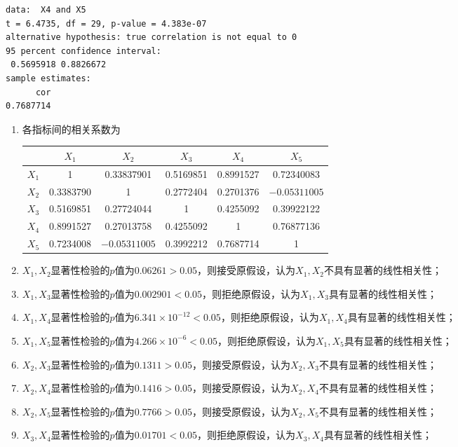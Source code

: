 \begin{enumerate}
\begin{lstlisting}
data:  X4 and X5
t = 6.4735, df = 29, p-value = 4.383e-07
alternative hypothesis: true correlation is not equal to 0
95 percent confidence interval:
 0.5695918 0.8826672
sample estimates:
      cor 
0.7687714 
\end{lstlisting}
    \summary
    \begin{enumerate}[label=(\arabic*)]
        \item 各指标间的相关系数为
        \begin{table}[H]
            \centering
            \begin{tabular}{|c|c|c|c|c|c|}
                \hline
                & $X_1$ & $X_2$ & $X_3$ & $X_4$ & $X_5$ \\ \hline
                $X_1$ & 1 & 0.33837901 & 0.5169851 & 0.8991527 & 0.72340083 \\ \hline
                $X_2$ & 0.3383790 & 1 & 0.2772404 & 0.2701376 & $-0.05311005$ \\ \hline
                $X_3$ & 0.5169851 & 0.27724044 & 1 & 0.4255092 & 0.39922122 \\ \hline
                $X_4$ & 0.8991527 & 0.27013758 & 0.4255092 & 1 & 0.76877136 \\ \hline
                $X_5$ & 0.7234008 & $-0.05311005$ & 0.3992212 & 0.7687714 & 1 \\ \hline
            \end{tabular}
        \end{table}
        \item $X_1,X_2$显著性检验的$p$值为$0.06261 > 0.05$，则接受原假设，认为$X_1,X_2$不具有显著的线性相关性；
        \item $X_1,X_3$显著性检验的$p$值为$0.002901 < 0.05$，则拒绝原假设，认为$X_1,X_3$具有显著的线性相关性；
        \item $X_1,X_4$显著性检验的$p$值为$6.341\times 10^{-12} < 0.05$，则拒绝原假设，认为$X_1,X_4$具有显著的线性相关性；
        \item $X_1,X_5$显著性检验的$p$值为$4.266\times 10^{-6} < 0.05$，则拒绝原假设，认为$X_1,X_5$具有显著的线性相关性；
        \item $X_2,X_3$显著性检验的$p$值为$0.1311 > 0.05$，则接受原假设，认为$X_2,X_3$不具有显著的线性相关性；
        \item $X_2,X_4$显著性检验的$p$值为$0.1416 > 0.05$，则接受原假设，认为$X_2,X_4$不具有显著的线性相关性；
        \item $X_2,X_5$显著性检验的$p$值为$0.7766 > 0.05$，则接受原假设，认为$X_2,X_5$不具有显著的线性相关性；
        \item $X_3,X_4$显著性检验的$p$值为$0.01701 < 0.05$，则拒绝原假设，认为$X_3,X_4$具有显著的线性相关性；

\end{enumerate}
\end{enumerate}
